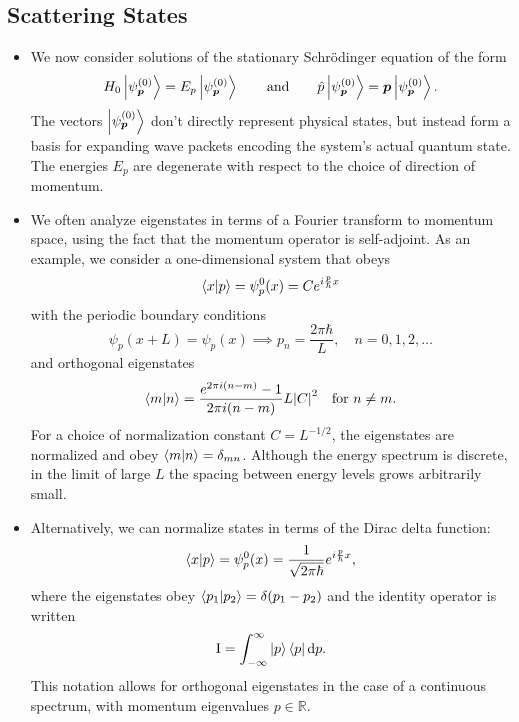 \documentclass[11pt, a4paper]{article}
\newcommand{\diff}{\mathop{}\!\mathrm{d}} %
\newcommand{\Schro}{Schr\"{o}dinger\xspace}
\renewcommand{\vec}[1]{\bm{#1}}  %
\newcommand{\II}{\operatorname{I}}  %
\begin{document}
\subsection{Scattering States}
\begin{itemize}
    \item We now consider solutions of the stationary \Schro equation of the form
    \begin{equation*}
        H_{0} \ket{\psi_{\vec{p}}^{(0)}} = E_{p}\ket{\psi_{\vec{p}}^{(0)}} \qquad \text{and} \qquad \hat{p} \ket{\psi_{\vec{p}}^{(0)}} = \vec{p}\ket{\psi_{\vec{p}}^{(0)}}.
    \end{equation*}
    The vectors $ \ket{\psi_{\vec{p}}^{(0)}} $ don't directly represent physical states, but instead form a basis for expanding wave packets encoding the system's actual quantum state. The energies $ E_{p} $ are degenerate with respect to the choice of direction of momentum. 

    \item We often analyze eigenstates in terms of a Fourier transform to momentum space, using the fact that the momentum operator is self-adjoint. As an example, we consider a one-dimensional system that obeys
    \begin{equation*}
        \braket{x}{p} = \psi_{p}^{0}(x) = Ce^{i \frac{p}{\hbar}x}
    \end{equation*}
    with the periodic boundary conditions
    \begin{equation*}
        \psi_{p}(x + L) = \psi_{p}(x) \implies p_{n} = \frac{2\pi \hbar}{L}, \quad n = 0, 1, 2, \ldots
    \end{equation*}
    and orthogonal eigenstates
    \begin{equation*}
        \braket{m}{n} = \frac{e^{2 \pi i(n - m)} - 1}{2\pi i (n-m)}L \abs{C}^{2} \quad \text{for } n \neq m.
    \end{equation*}
    For a choice of normalization constant $ C = L^{-1/2} $, the eigenstates are normalized and obey $ \braket{m}{n} = \delta_{mn} $. Although the energy spectrum is discrete, in the limit of large $ L $ the spacing between energy levels grows arbitrarily small. 

    \item Alternatively, we can normalize states in terms of the Dirac delta function:
    \begin{equation*}
        \braket{x}{p} = \psi_{p}^{0}(x) = \frac{1}{\sqrt{2\pi \hbar}} e^{i \frac{p}{\hbar}x},
    \end{equation*}
    where the eigenstates obey $ \braket{p_{1}}{p_{2}} = \delta(p_{1} - p_{2}) $ and the identity operator is written
    \begin{equation*}
        \II = \int_{-\infty}^{\infty} \ket{p} \bra{p} \diff p.
    \end{equation*}
    This notation allows for orthogonal eigenstates in the case of a continuous spectrum, with momentum eigenvalues $ p \in \mathbb{R} $. 
    

\end{itemize}
\end{document}
